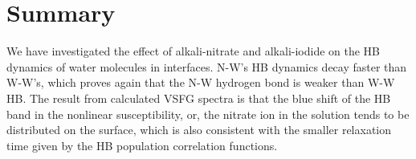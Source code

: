 
\section{Summary}
We have investigated the effect of alkali-nitrate and alkali-iodide on the HB dynamics
of water molecules in interfaces.
N-W's HB dynamics decay faster than W-W's, 
which proves again that the N-W hydrogen bond is weaker than W-W HB. 
The result from calculated VSFG spectra is that the blue shift of the HB band in the nonlinear susceptibility, 
or, the nitrate ion in the solution tends to be distributed on the surface, 
which is also consistent with the smaller relaxation time given by the HB population correlation functions.

